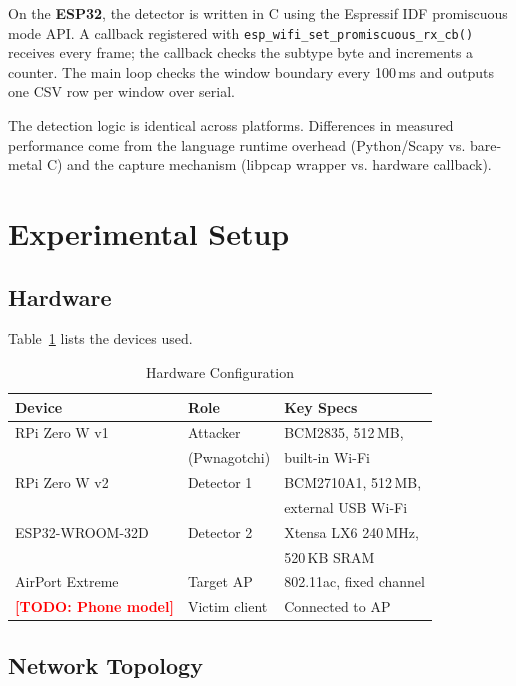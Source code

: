 \documentclass[conference]{IEEEtran}
\newcommand{\placeholder}[1]{\textcolor{red}{\textbf{[TODO: #1]}}}
\begin{document}
On the \textbf{ESP32}, the detector is written in C using the Espressif IDF promiscuous mode API. A callback registered with \texttt{esp\_wifi\_set\_promiscuous\_rx\_cb()} receives every frame; the callback checks the subtype byte and increments a counter. The main loop checks the window boundary every 100\,ms and outputs one CSV row per window over serial.

The detection logic is identical across platforms. Differences in measured performance come from the language runtime overhead (Python/Scapy vs. bare-metal C) and the capture mechanism (libpcap wrapper vs. hardware callback).

\section{Experimental Setup}
\label{sec:setup}

\subsection{Hardware}

Table~\ref{tab:hardware} lists the devices used.

\begin{table}[htbp]
\caption{Hardware Configuration}
\label{tab:hardware}
\centering
\small
\begin{tabular}{@{}lll@{}}
\toprule
\textbf{Device} & \textbf{Role} & \textbf{Key Specs} \\
\midrule
RPi Zero W v1 & Attacker & BCM2835, 512\,MB, \\
 & (Pwnagotchi) & built-in Wi-Fi \\
RPi Zero W v2 & Detector 1 & BCM2710A1, 512\,MB, \\
 & & external USB Wi-Fi \\
ESP32-WROOM-32D & Detector 2 & Xtensa LX6 240\,MHz, \\
 & & 520\,KB SRAM \\
AirPort Extreme & Target AP & 802.11ac, fixed channel \\
\placeholder{Phone model} & Victim client & Connected to AP \\
\bottomrule
\end{tabular}
\end{table}

\subsection{Network Topology}
\end{document}
